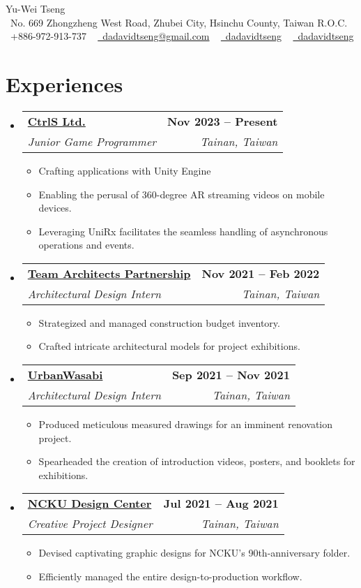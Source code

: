 \documentclass[letterpaper,11pt]{article}
\makeatletter
\newcommand{\resumeItem}[1]{
    \item\small{
            {#1 \vspace{-2pt}}
    }
}
\newcommand{\resumeSubheading}[4]{
    \vspace{-2pt}\item
    \begin{tabular*}{1.0\textwidth}[t]{l@{\extracolsep{\fill}}r}
    \textbf{#1} & \textbf{\small #2} \\
    \textit{\small#3} & \textit{\small #4} \\
    \end{tabular*}\vspace{-7pt}
}
\newcommand{\resumeSubHeadingListStart}{\begin{itemize}[leftmargin=0.0in, label={}]}
\newcommand{\resumeSubHeadingListEnd}{\end{itemize}}
\newcommand{\resumeItemListStart}{\begin{itemize}}
\newcommand{\resumeItemListEnd}{\end{itemize}\vspace{-5pt}}
\makeatother
\begin{document}
\begin{center}
{\Huge Yu-Wei Tseng} \\ \vspace{1pt}
\small
\faHouseUser\ No. 669 Zhongzheng West Road, Zhubei City, Hsinchu County, Taiwan R.O.C. \\ \vspace{1pt}
\raisebox{-0.1\height}\faPhone\ +886-972-913-737 ~
\href{mailto:dadavidtseng@gmail.com}{\faEnvelope\ dadavidtseng@gmail.com} ~
\href{https://linkedin.com/in/dadavidtseng}{\faLinkedin\ dadavidtseng}  ~
\href{https://github.com/dadavidtseng}{\faGithub\ dadavidtseng}
\vspace{-8pt}
\end{center}





\section{Experiences}
\resumeSubHeadingListStart
\resumeSubheading
{\href{https://www.ctrls1890.com/}{CtrlS Ltd.}}{Nov 2023 -- Present}{Junior Game Programmer}{Tainan, Taiwan}
\resumeItemListStart
\resumeItem {Crafting applications with Unity Engine}
\resumeItem {Enabling the perusal of 360-degree AR streaming videos on mobile devices.}
\resumeItem {Leveraging UniRx facilitates the seamless handling of asynchronous operations and events.}
\resumeItemListEnd

\resumeSubheading
{\href{https://www.tap-arch.tw//en}
{Team Architects Partnership}}{Nov 2021 -- Feb 2022}
{Architectural Design Intern}{Tainan, Taiwan}
\resumeItemListStart
\resumeItem {Strategized and managed construction budget inventory.}
\resumeItem {Crafted intricate architectural models for project exhibitions.}
\resumeItemListEnd

\resumeSubheading
{\href{https://www.urbanwasabi.com.tw/}
{UrbanWasabi}}{Sep 2021 -- Nov 2021}
{Architectural Design Intern}{Tainan, Taiwan}
\resumeItemListStart
\resumeItem {Produced meticulous measured drawings for an imminent renovation project.}
\resumeItem {Spearheaded the creation of introduction videos, posters, and booklets for exhibitions.}
\resumeItemListEnd

\resumeSubheading
{\href{https://www.nckudc.com.tw/}
{NCKU Design Center}}{Jul 2021 -- Aug 2021}
{Creative Project Designer}{Tainan, Taiwan}
\resumeItemListStart
\resumeItem {Devised captivating graphic designs for NCKU's 90th-anniversary folder.}
\resumeItem {Efficiently managed the entire design-to-production workflow.}
\resumeItemListEnd
\resumeSubHeadingListEnd
\end{document}
